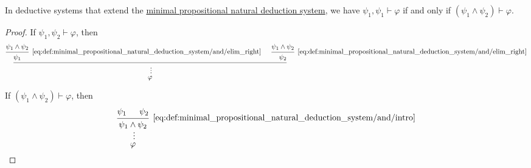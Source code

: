 \begin{proposition}\label{thm:conjunction_of_premises}
  In deductive systems that extend the \hyperref[def:minimal_propositional_natural_deduction_system]{minimal propositional natural deduction system}, we have \( \psi_1, \psi_1 \vdash \varphi \) if and only if \( (\psi_1 \wedge \psi_2) \vdash \varphi \).
\end{proposition}
\begin{proof}
  \SufficiencySubProof If \( \psi_1, \psi_2 \vdash \varphi \), then
  \begin{equation*}
    \begin{prooftree}
      \hypo{ \psi_1 \wedge \psi_2 }
      \infer1[\eqref{eq:def:minimal_propositional_natural_deduction_system/and/elim_right}]{ \psi_1 }

      \hypo{ \psi_1 \wedge \psi_2 }
      \infer1[\eqref{eq:def:minimal_propositional_natural_deduction_system/and/elim_right}]{ \psi_2 }

      \infer2{}

      \ellipsis{}{ \varphi }
    \end{prooftree}
  \end{equation*}

  \NecessitySubProof If \( (\psi_1 \wedge \psi_2) \vdash \varphi \), then
  \begin{equation*}
    \begin{prooftree}
      \hypo{ \psi_1 }
      \hypo{ \psi_2 }
      \infer2[\eqref{eq:def:minimal_propositional_natural_deduction_system/and/intro}]{ \psi_1 \wedge \psi_2 }
      \ellipsis{}{ \varphi }
    \end{prooftree}
  \end{equation*}
\end{proof}

